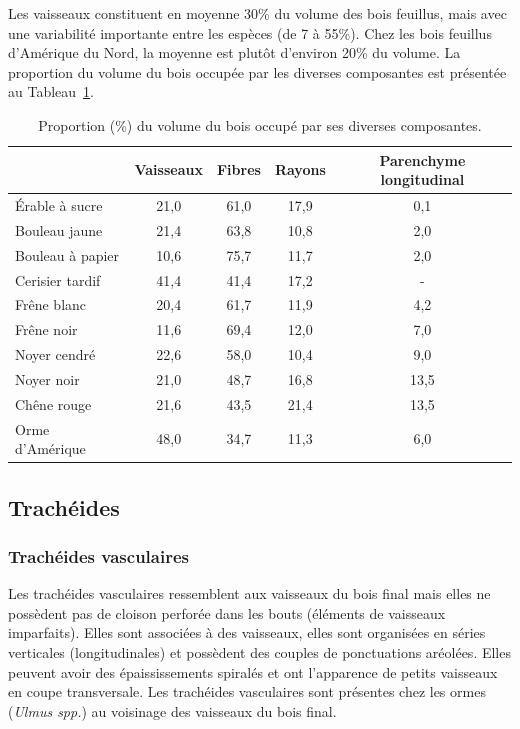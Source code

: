 Les vaisseaux constituent en moyenne 30\% du volume des bois feuillus, mais avec une variabilité importante entre les espèces (de 7 à 55\%). Chez les bois feuillus d'Amérique du Nord, la moyenne est plutôt d'environ 20\% du volume. La proportion du volume du bois occupée par les diverses composantes est présentée au Tableau~\ref{tab:prop_feuillus}.

\begin{table}[ht]
\centering
	\begin{tabular}{l c c c c}
	\hline
		& \bf Vaisseaux	& \bf	Fibres	& \bf	Rayons	& \bf	Parenchyme longitudinal	\\
		\hline
		\hline
		Érable à sucre	&	21,0	&	61,0	&	17,9	&	0,1	\\
		Bouleau jaune	&	21,4	&	63,8	&	10,8	&	2,0	\\
		Bouleau à papier	&	10,6	&	75,7	&	11,7	&	2,0	\\
		Cerisier tardif	&	41,4	&	41,4	&	17,2	&	-	\\
		Frêne blanc	&	20,4	&	61,7	&	11,9	&	4,2	\\
		Frêne noir	&	11,6	&	69,4	&	12,0	&	7,0	\\
		Noyer cendré	&	22,6	&	58,0	&	10,4	&	9,0	\\
		Noyer noir	&	21,0	&	48,7	&	16,8	&	13,5	\\
		Chêne rouge	&	21,6	&	43,5	&	21,4	&	13,5	\\
		Orme d’Amérique	&	48,0	&	34,7	&	11,3	&	6,0	\\
	\hline
	\end{tabular}
\caption{Proportion (\%) du volume du bois occupé par ses diverses composantes.}
\label{tab:prop_feuillus}
\end{table}

\subsection{Trachéides}

\subsubsection{Trachéides vasculaires}

Les trachéides vasculaires ressemblent aux vaisseaux du bois final mais elles ne possèdent pas de cloison perforée dans les bouts (éléments de vaisseaux imparfaits). Elles sont associées à des vaisseaux, elles sont organisées en séries verticales (longitudinales) et possèdent des couples de ponctuations aréolées.  Elles peuvent avoir des épaississements spiralés et ont l'apparence de petits vaisseaux en coupe transversale.  Les trachéides vasculaires sont présentes chez les ormes (\textit{Ulmus spp.}) au voisinage des vaisseaux du bois final.

